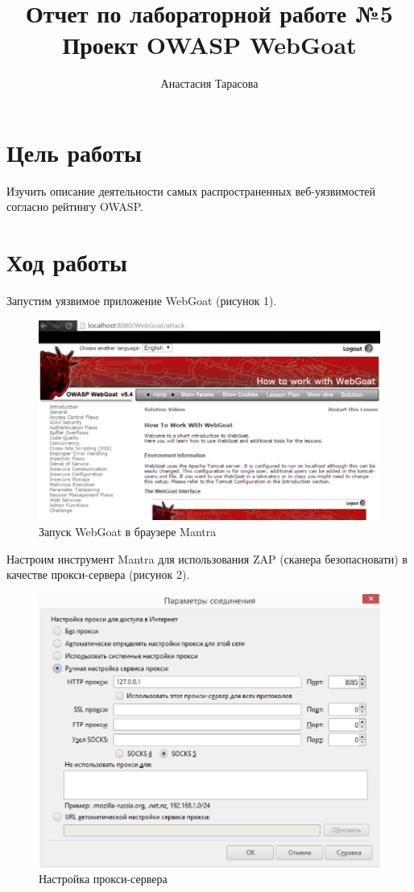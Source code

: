 \documentclass[10pt,a4paper]{article}
\author{Анастасия Тарасова}
\title{Отчет по лабораторной работе №5\\ Проект OWASP WebGoat}
\begin{document}
\maketitle
\section{Цель работы}
Изучить описание деятельности самых распространенных веб-уязвимостей согласно рейтингу OWASP.
\section{Ход работы}
Запустим уязвимое приложение WebGoat (рисунок 1).
\FloatBarrier
\begin{figure}[h!]
\centering
\includegraphics[scale=0.5]{1}
\caption{Запуск WebGoat в браузере Mantra}
\end{figure}
\FloatBarrier
Настроим инструмент Mantra для использования ZAP (сканера безопасновати) в качестве прокси-сервера (рисунок 2).
\FloatBarrier
\begin{figure}[h!]
\centering
\includegraphics[scale=0.5]{2}
\caption{Настройка прокси-сервера}
\end{figure}
\end{document}
